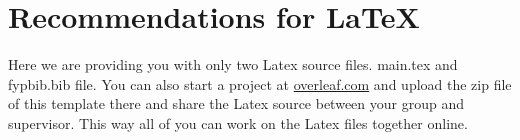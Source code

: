 \documentclass{FastFyp}
\begin{document}
\section{Recommendations for \LaTeX}
Here we are providing you with only two Latex source files.  main.tex and fypbib.bib file. You can also start a project at \url{overleaf.com} and upload the zip file of this template there and share the Latex source between your group and supervisor.  This way all of you can work on the Latex files together online.
\end{document}
